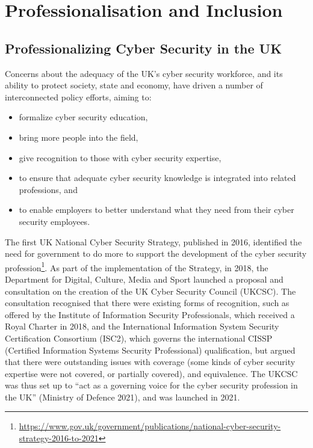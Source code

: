 \documentclass[
  a4paper,
]{book}
\begin{document}

\chapter{Professionalisation and
Inclusion}\label{professionalisation-and-inclusion}

\section{Professionalizing Cyber Security in the
UK}\label{professionalizing-cyber-security-in-the-uk}

Concerns about the adequacy of the UK's cyber security workforce, and
its ability to protect society, state and economy, have driven a number
of interconnected policy efforts, aiming to:

\begin{itemize}
\item
  formalize cyber security education,
\item
  bring more people into the field,
\item
  give recognition to those with cyber security expertise,
\item
  to ensure that adequate cyber security knowledge is integrated into
  related professions, and
\item
  to enable employers to better understand what they need from their
  cyber security employees.
\end{itemize}

The first UK National Cyber Security Strategy, published in 2016,
identified the need for government to do more to support the development
of the cyber security profession\footnote{\url{https://www.gov.uk/government/publications/national-cyber-security-strategy-2016-to-2021}}.
As part of the implementation of the Strategy, in 2018, the Department
for Digital, Culture, Media and Sport launched a proposal and
consultation on the creation of the UK Cyber Security Council (UKCSC).
The consultation recognised that there were existing forms of
recognition, such as offered by the Institute of Information Security
Professionals, which received a Royal Charter in 2018, and the
International Information System Security Certification Consortium
(ISC2), which governs the international CISSP (Certified Information
Systems Security Professional) qualification, but argued that there were
outstanding issues with coverage (some kinds of cyber security expertise
were not covered, or partially covered), and equivalence. The UKCSC was
thus set up to ``act as a governing voice for the cyber security
profession in the UK'' (Ministry of Defence 2021), and was launched in
2021.
\end{document}
